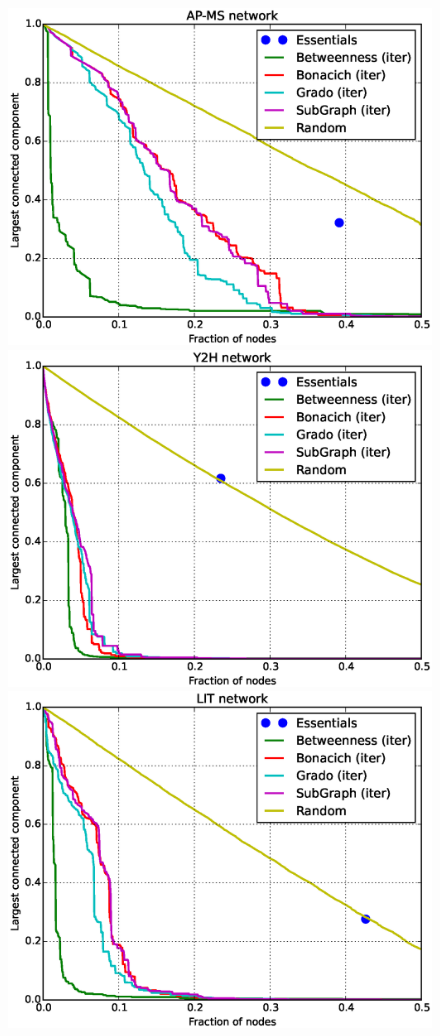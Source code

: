 \begin{figure}
\centering
\includegraphics[scale = 0.30]{figuras/AP-MS} 
\includegraphics[scale = 0.30]{figuras/Y2H} \\
\includegraphics[scale = 0.30]{figuras/LIT} 

\end{figure}
